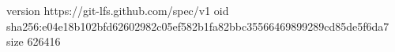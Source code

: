 version https://git-lfs.github.com/spec/v1
oid sha256:e04e18b102bfd62602982c05ef582b1fa82bbc35566469899289cd85de5f6da7
size 626416
